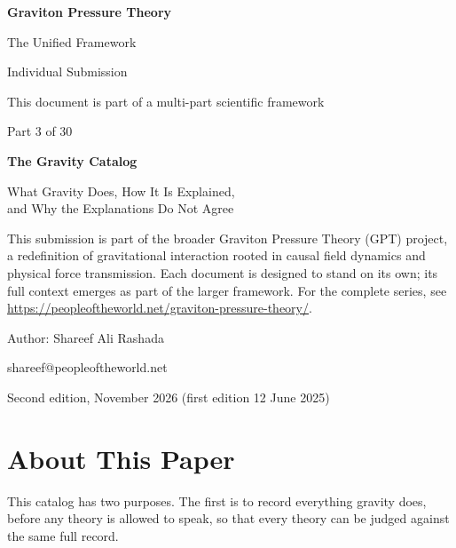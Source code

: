 \documentclass[11pt,a4paper]{article}
\begin{document}
\begin{titlepage}
\centering
\vspace*{1.5cm}
{\Huge\bfseries Graviton Pressure Theory\par}
\vspace{0.4cm}
{\Large The Unified Framework\par}
{\large Individual Submission\par}
\vspace{0.3cm}
{\normalsize This document is part of a multi-part scientific framework\par}
\vspace{1.6cm}
{\large Part 3 of 30\par}
\vspace{0.6cm}
{\huge\bfseries The Gravity Catalog\par}
\vspace{0.5cm}
{\Large What Gravity Does, How It Is Explained,\\[2pt] and Why the Explanations Do Not Agree\par}
\vspace{1.4cm}
\begin{minipage}{0.82\textwidth}\centering\small
This submission is part of the broader Graviton Pressure Theory (GPT) project, a redefinition of gravitational interaction rooted in causal field dynamics and physical force transmission. Each document is designed to stand on its own; its full context emerges as part of the larger framework. For the complete series, see \url{https://peopleoftheworld.net/graviton-pressure-theory/}.
\end{minipage}
\vfill
{\large Author: Shareef Ali Rashada\par}
{\normalsize shareef@peopleoftheworld.net\par}
\vspace{0.3cm}
{\normalsize Second edition, November 2026 \quad (first edition 12 June 2025)\par}
\end{titlepage}

\tableofcontents
\newpage

\section*{About This Paper}

This catalog has two purposes. The first is to record everything gravity does, before any theory is allowed to speak, so that every theory can be judged against the same full record.
\end{document}
